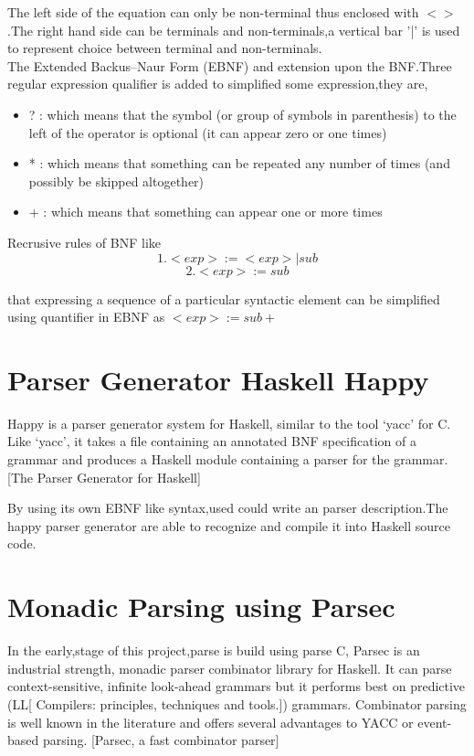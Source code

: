 The left side of the equation can only be non-terminal thus enclosed with $<>$ .The right hand side can be terminals and non-terminals,a vertical bar '|' is used to represent choice between terminal and non-terminals.\\

The  Extended Backus–Naur Form (EBNF) and extension upon the BNF.Three regular expression qualifier is added to simplified some expression,they are,
\begin{itemize}
\item ? : which means that the symbol (or group of symbols in parenthesis) to the left of the operator is
optional (it can appear zero or one times)
\item * : which means that something can be repeated any number of times (and possibly be skipped
altogether)
\item + : which means that something can appear one or more times 
\end{itemize} \cite{book}

Recrusive rules of BNF  like 
\[   1. <exp> := <exp> | sub \]
\[	 2. <exp> := sub     \]
 
that expressing a sequence of a particular syntactic element can be simplified using quantifier in EBNF as $ <exp>:=sub+ $



\section{Parser Generator Haskell Happy}
Happy is a parser generator system for Haskell, similar to the tool `yacc' for C. Like `yacc', it takes a file containing an annotated BNF specification of a grammar and produces a Haskell module containing a parser for the grammar.
[The Parser Generator for Haskell] 

By using its own EBNF like syntax,used could write an parser description.The happy parser generator are able to recognize and compile it into Haskell source code.


\section{Monadic Parsing using Parsec}
In the early,stage of this project,parse is build using parse C,
Parsec is an industrial strength, monadic parser combinator library for Haskell. It can parse context-sensitive, infinite look-ahead grammars but it performs best on
predictive (LL[ Compilers: principles, techniques and tools.]) grammars. Combinator parsing is well known in the literature
and offers several advantages to YACC or event-based parsing. [Parsec, a fast combinator parser] 

